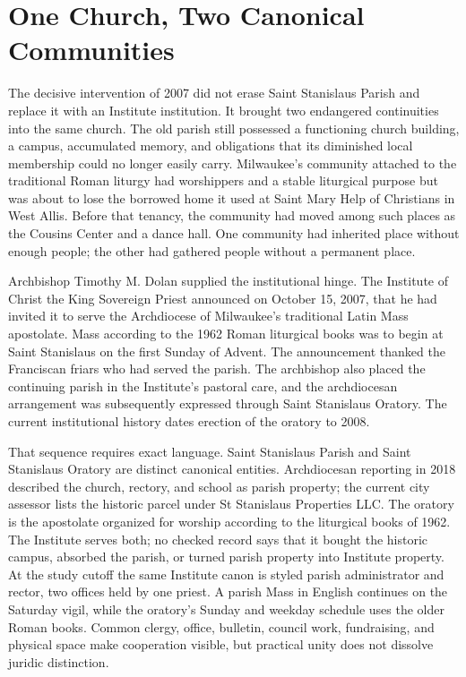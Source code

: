 \section{One Church, Two Canonical Communities}

The decisive intervention of 2007 did not erase Saint Stanislaus Parish and replace it with an Institute institution. It brought two endangered continuities into the same church. The old parish still possessed a functioning church building, a campus, accumulated memory, and obligations that its diminished local membership could no longer easily carry. Milwaukee's community attached to the traditional Roman liturgy had worshippers and a stable liturgical purpose but was about to lose the borrowed home it used at Saint Mary Help of Christians in West Allis. Before that tenancy, the community had moved among such places as the Cousins Center and a dance hall. One community had inherited place without enough people; the other had gathered people without a permanent place.

Archbishop Timothy M. Dolan supplied the institutional hinge. The Institute of Christ the King Sovereign Priest announced on October 15, 2007, that he had invited it to serve the Archdiocese of Milwaukee's traditional Latin Mass apostolate. Mass according to the 1962 Roman liturgical books was to begin at Saint Stanislaus on the first Sunday of Advent. The announcement thanked the Franciscan friars who had served the parish. The archbishop also placed the continuing parish in the Institute's pastoral care, and the archdiocesan arrangement was subsequently expressed through Saint Stanislaus Oratory. The current institutional history dates erection of the oratory to 2008.

That sequence requires exact language. Saint Stanislaus Parish and Saint Stanislaus Oratory are distinct canonical entities. Archdiocesan reporting in 2018 described the church, rectory, and school as parish property; the current city assessor lists the historic parcel under St Stanislaus Properties LLC. The oratory is the apostolate organized for worship according to the liturgical books of 1962. The Institute serves both; no checked record says that it bought the historic campus, absorbed the parish, or turned parish property into Institute property. At the study cutoff the same Institute canon is styled parish administrator and rector, two offices held by one priest. A parish Mass in English continues on the Saturday vigil, while the oratory's Sunday and weekday schedule uses the older Roman books. Common clergy, office, bulletin, council work, fundraising, and physical space make cooperation visible, but practical unity does not dissolve juridic distinction.

